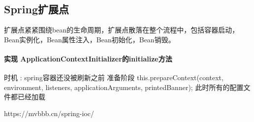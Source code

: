 \documentclass[../../../interview-questions.tex]{subfiles}
\begin{document}
\subsection{Spring扩展点}

扩展点紧紧围绕bean的生命周期，扩展点散落在整个流程中，包括容器启动，Bean实例化，Bean属性注入，Bean初始化，Bean销毁。

\paragraph{实现 ApplicationContextInitializer的initialize方法}


时机 : spring容器还没被刷新之前 准备阶段 this.prepareContext(context, environment, listeners, applicationArguments, printedBanner); 此时所有的配置文件都已经加载


https://mvbbb.cn/spring-ioc/
\end{document}
